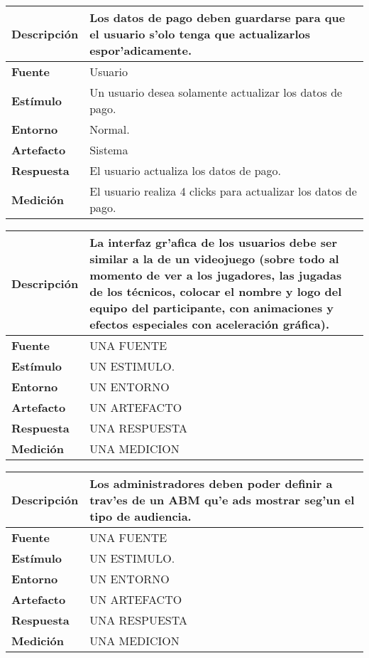 \begin{center}
  \begin{tabular}{| l | p{10cm} | }
    \hline
  \textbf{Descripción} & Los datos de pago deben guardarse para que el usuario s'olo tenga que actualizarlos espor'adicamente.\\  \hline
  \textbf{Fuente} & Usuario\\  \hline
  \textbf{Estímulo} & Un usuario desea solamente actualizar los datos de pago.\\  \hline
  \textbf{Entorno} & Normal.\\  \hline
  \textbf{Artefacto} & Sistema\\  \hline
  \textbf{Respuesta} & El usuario actualiza los datos de pago.\\  \hline
  \textbf{Medición} & El usuario realiza 4 clicks para actualizar los datos de pago.\\  \hline
  \end{tabular}
\end{center} 

\begin{center}
  \begin{tabular}{| l | p{10cm} | }
    \hline
  \textbf{Descripción} & La interfaz gr'afica de los usuarios debe ser similar a la de un videojuego (sobre todo al momento de ver a los jugadores, las jugadas de los técnicos, colocar el nombre y logo del equipo del participante, con animaciones y efectos especiales con aceleración gráfica). \\  \hline
  \textbf{Fuente} & UNA FUENTE\\  \hline
  \textbf{Estímulo} & UN ESTIMULO.\\  \hline
  \textbf{Entorno} & UN ENTORNO\\  \hline
  \textbf{Artefacto} & UN ARTEFACTO\\  \hline
  \textbf{Respuesta} & UNA RESPUESTA\\  \hline
  \textbf{Medición} & UNA MEDICION\\  \hline
  \end{tabular}
\end{center} 


\begin{center}
  \begin{tabular}{| l | p{10cm} | }
    \hline
    \textbf{Descripción} & Los administradores deben poder definir a trav'es de un ABM qu'e ads mostrar seg'un el tipo de audiencia.\\  \hline
  \textbf{Fuente} & UNA FUENTE\\  \hline
  \textbf{Estímulo} & UN ESTIMULO.\\  \hline
  \textbf{Entorno} & UN ENTORNO\\  \hline
  \textbf{Artefacto} & UN ARTEFACTO\\  \hline
  \textbf{Respuesta} & UNA RESPUESTA\\  \hline
  \textbf{Medición} & UNA MEDICION\\  \hline
  \end{tabular}
\end{center} 



